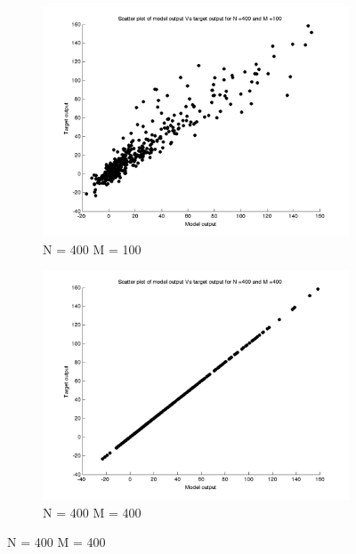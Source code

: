 \documentclass{article}
\begin{document}
\begin{figure}[H]
\begin{subfigure}{.5\textwidth}
\centering
\includegraphics[width=\linewidth]{D2/Scatter/VaryingM_N400M100}
\caption{N = 400 M = 100}
\end{subfigure}
\begin{subfigure}{.5\textwidth}
\includegraphics[width=\linewidth]{D2/Scatter/VaryingM_N400M400}
\caption{N = 400 M = 400}
\end{subfigure}


\end{figure}
\end{document}
